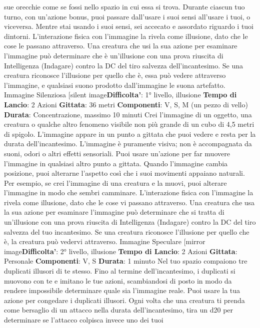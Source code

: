 \begin{multicols}{2}
sue orecchie come se fossi nello spazio in cui essa si
trova. Durante ciascun tuo turno, con un’azione bonus,
puoi passare dall’usare i suoi sensi all’usare i tuoi, o
viceversa. Mentre stai usando i suoi sensi, sei accecato
e assordato riguardo i tuoi dintorni.
L’interazione fisica con l’immagine la rivela come
illusione, dato che le cose le passano attraverso. Una
creatura che usi la sua azione per esaminare
l’immagine può determinare che è un’illusione con una
prova riuscita di Intelligenza (Indagare) contro la DC del
tiro salvezza dell’incantesimo. Se una creatura
riconosce l’illusione per quello che è, essa può vedere
attraverso l’immagine, e qualsiasi suono prodotto
dall’immagine le suona artefatto.
Immagine Silenziosa
[silent image\textbf{Difficolta'}:
1° livello, illusione
\textbf{Tempo di Lancio}: 2 Azioni
\textbf{Gittata}: 36 metri
\textbf{Componenti}: V, S, M (un pezzo di vello)
\textbf{Durata}: Concentrazione, massimo 10 minuti
Crei l’immagine di un oggetto, una creatura o qualche
altro fenomeno visibile non più grande di un cubo di 4,5
metri di spigolo. L’immagine appare in un punto a
gittata che puoi vedere e resta per la durata
dell’incantesimo. L’immagine è puramente visiva; non è
accompagnata da suoni, odori o altri effetti sensoriali.
Puoi usare un’azione per far muovere l’immagine in
qualsiasi altro punto a gittata. Quando l’immagine
cambia posizione, puoi alterarne l’aspetto così che i
suoi movimenti appaiano naturali. Per esempio, se crei
l’immagine di una creatura e la muovi, puoi alterare
l’immagine in modo che sembri camminare.
L’interazione fisica con l’immagine la rivela come
illusione, dato che le cose vi passano attraverso. Una
creatura che usa la sua azione per esaminare
l’immagine può determinare che si tratta di un’illusione
con una prova riuscita di Intelligenza (Indagare) contro
la DC del tiro salvezza del tuo incantesimo. Se una
creatura riconosce l’illusione per quello che è, la
creatura può vedervi attraverso.
Immagine Speculare
[mirror image\textbf{Difficolta'}:
2° livello, illusione
\textbf{Tempo di Lancio}: 2 Azioni
\textbf{Gittata}: Personale
\textbf{Componenti}: V, S
\textbf{Durata}: 1 minuto
Nel tuo spazio compaiono tre duplicati illusori di te
stesso. Fino al termine dell’incantesimo, i duplicati si
muovono con te e imitano le tue azioni, scambiandosi di
posto in modo da rendere impossibile determinare
quale sia l’immagine reale. Puoi usare la tua azione per
congedare i duplicati illusori.
Ogni volta che una creatura ti prenda come bersaglio di
un attacco nella durata dell’incantesimo, tira un d20 per
determinare se l’attacco colpisca invece uno dei tuoi

\end{multicols}

